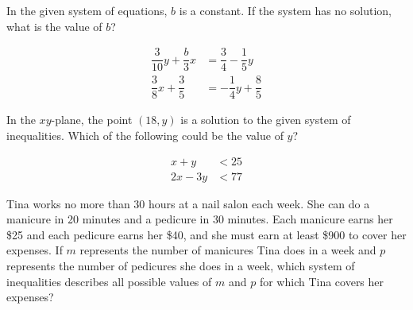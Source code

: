 In the given system of equations, $b$ is a constant. If the system has no solution, what is the value of $b$?

\vspace{0.5em}

\[
\begin{aligned}
\dfrac{3}{10}y + \dfrac{b}{3}x &= \dfrac{3}{4} - \dfrac{1}{5}y \\
\dfrac{3}{8}x + \dfrac{3}{5} &= -\dfrac{1}{4}y + \dfrac{8}{5}
\end{aligned}
\]

\vspace{2em}

\noindent\markforreview
\vspace{1em}

In the $xy$-plane, the point $(18, y)$ is a solution to the given system of inequalities. Which of the following could be the value of $y$?

\vspace{0.5em}

\[
\begin{aligned}
x + y &< 25 \\
2x - 3y &< 77
\end{aligned}
\]

\vspace{0.75em}


\vspace{2em}

\noindent\markforreview
\vspace{1em}

Tina works no more than 30 hours at a nail salon each week. She can do a manicure in 20 minutes and a pedicure in 30 minutes. Each manicure earns her \$25 and each pedicure earns her \$40, and she must earn at least \$900 to cover her expenses. If $m$ represents the number of manicures Tina does in a week and $p$ represents the number of pedicures she does in a week, which system of inequalities describes all possible values of $m$ and $p$ for which Tina covers her expenses?

\vspace{0.75em}


